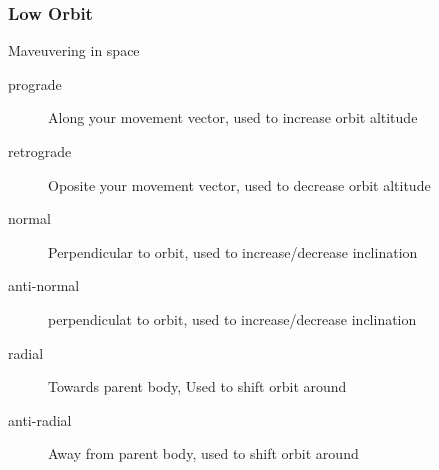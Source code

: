 {\begin{frame}
\begin{block}{}
\begin{center}
        \end{center}
    \end{block}
\end{frame}
\begin{frame}
    \frametitle{Low Orbit}
    \begin{block}{Maveuvering in space}
        \begin{description}
            \item [prograde] Along your movement vector, used to increase orbit altitude
            \item [retrograde] Oposite your movement vector, used to decrease orbit altitude
            \item [normal] Perpendicular to orbit, used to increase/decrease inclination
            \item [anti-normal] perpendiculat to orbit, used to increase/decrease inclination
            \item [radial] Towards parent body, Used to shift orbit around
            \item [anti-radial] Away from parent body, used to shift orbit around
        \end{description}
    \end{block}
\end{frame}
}

